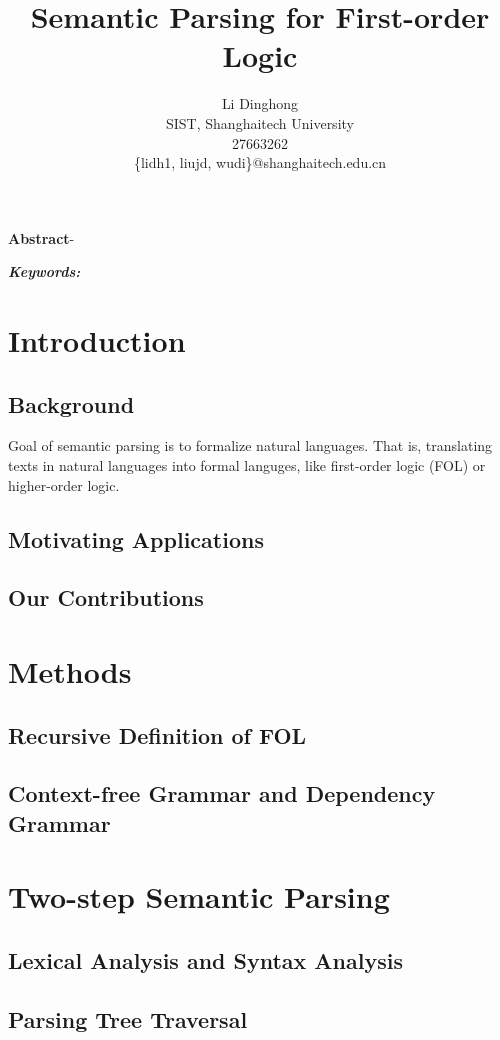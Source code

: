 \documentclass{article}
\title{Semantic Parsing for First-order Logic}
\author{
	Li Dinghong\\
	SIST, Shanghaitech University\\
	27663262\\
	\{lidh1, liujd, wudi\}@shanghaitech.edu.cn
}
\begin{document}
{
	\newpage
	\maketitle

	\textbf{Abstract}-{}

	\vspace{5pt}
	\textbf{\emph{Keywords:}} {}

	\tableofcontents
}

\section{Introduction}{
	\subsection{Background}{
		Goal of semantic parsing is to formalize natural languages. That is, translating texts in natural languages into formal languges, like first-order logic (FOL) or higher-order logic. 
	}

	\subsection{Motivating Applications}{
		\cite{su} 
	}

	\subsection{Our Contributions}{}
}

\section{Methods}{
	\subsection{Recursive Definition of FOL}{}

	\subsection{Context-free Grammar and Dependency Grammar}{}
}

\section{Two-step Semantic Parsing}{
	\subsection{Lexical Analysis and Syntax Analysis}{}

	\subsection{Parsing Tree Traversal}{}
}
\end{document}
